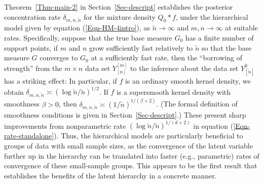 \documentclass[MSNbibl,number,citesort]{arxbj}
\newcommand{\eqref}[1]{(\ref{#1})}
\def\comment{}
\newcommand{\DP}{\mathscr{D}}
\newcommand{\PGz}{P_{Y_{[n]}|G_0}}
\newcommand{\YYn}{Y_{[n]}}
\newcommand{\epsmn}{\varepsilon_{mn}}
\newcommand{\nn}{\tilde{n}}
\begin{document}
Theorem~\ref{Thm-main-2} in Section~\ref{Sec-descript} establishes
the posterior concentration rate $\delta_{m,n,\nn}$ for the mixture
density $Q_0*f$, under the hierarchical model given by equation \eqref
{Eqn-HM-4intro},
as $\nn\rightarrow\infty$ and $m,n \rightarrow\infty$
at suitable rates.
%
Specifically, suppose that the true base measure $G_0$ has a
finite number of support points, if $m$ and
$n$ grow sufficiently fast relatively to $\nn$ so that the base measure
$G$ converges to $G_0$ at a sufficiently fast rate, then
the ``borrowing of strength'' from the $m\times n$ data set $\YYn^{[m]}$
to the inference about the data set $Y_{[\nn]}^0$ has a striking effect:
In particular, if $f$ is an ordinary smooth kernel density, we obtain
$\delta_{m,n,\nn} \asymp(\log\nn/\nn)^{1/2}$. If $f$ is a supersmooth
kernel density with smoothness $\beta> 0$, then $\delta_{m,n,\nn}
\asymp
(1/\nn)^{1/(\beta+2)}$. (The formal definition of smoothness
conditions is
given in Section~\ref{Sec-descript}.) These present
sharp improvements from nonparametric rate $(\log\nn/\nn)^{1/(d+2)}$
in equation \eqref{Eqn-rate-standalone}.
Thus, the hierarchical models are particularly beneficial to
groups of data with small sample sizes, as the convergence
of the latent variable further up in the hierarchy can be
translated into faster (e.g., parametric) rates of convergence
of these small-sample groups.
This appears to be the first result that establishes the benefits of
the latent hierarchy in a concrete manner.
\end{document}

